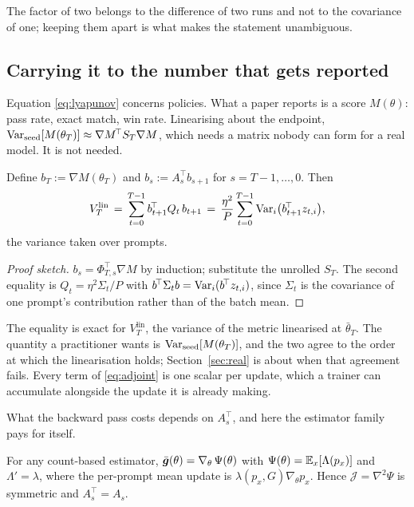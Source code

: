 The factor of two belongs to the difference of two runs and not to the covariance of one; keeping
them apart is what makes the statement unambiguous.

\subsection{Carrying it to the number that gets reported}

Equation \eqref{eq:lyapunov} concerns policies. What a paper reports is a score $M(\theta)$:
pass rate, exact match, win rate. Linearising about the endpoint,
$\operatorname{Var}_{\text{seed}}[M(\theta_T)] \approx \nabla M^{\!\top} S_T \nabla M$, which needs a matrix
nobody can form for a real model. It is not needed.

\begin{theorem}
  \label{thm:adjoint}
  Define $b_T := \nabla M(\theta_T)$ and $b_s := A_s^{\!\top} b_{s+1}$ for $s = T-1,\dots,0$. Then
  \begin{equation}
    \label{eq:adjoint}
      V^{\text{lin}}_T \,=\, \sum_{t=0}^{T-1} b_{t+1}^{\!\top} Q_t\, b_{t+1}
      \,=\, \frac{\eta^2}{P}\sum_{t=0}^{T-1} \operatorname{Var}_{i}\!\big(b_{t+1}^{\!\top} z_{t,i}\big),
  \end{equation}
  the variance taken over prompts.
\end{theorem}

\begin{proof}[Proof sketch]
  $b_s = \Phi_{T,s}^{\!\top}\nabla M$ by induction; substitute the unrolled $S_T$. The second
  equality is $Q_t = \eta^2\Sigma_t/P$ with
  $b^{\!\top}\Sigma_t b = \operatorname{Var}_i(b^{\!\top} z_{t,i})$, since $\Sigma_t$ is the covariance of one
  prompt's contribution rather than of the batch mean.
\end{proof}

The equality is exact for $V^{\text{lin}}_T$, the variance of the metric linearised at
$\bar\theta_T$. The quantity a practitioner wants is $\operatorname{Var}_{\text{seed}}[M(\theta_T)]$, and the two
agree to the order at which the linearisation holds; Section~\ref{sec:real} is about when that
agreement fails. Every term of \eqref{eq:adjoint} is one scalar per update, which a trainer can
accumulate alongside the update it is already making.

What the backward pass costs depends on $A_s^{\!\top}$, and here the estimator family pays for
itself.

\begin{proposition}
  \label{prop:potential}
  For any count-based estimator, $\bar{\bm{g}}(\theta) = \nabla_\theta\,\Psi(\theta)$ with
  $\Psi(\theta) = \mathbb{E}_x[\Lambda(p_x)]$ and $\Lambda' = \lambda$, where the per-prompt mean update is
  $\lambda(p_x, G)\nabla_\theta p_x$. Hence $\mathcal{J} = \nabla^2\Psi$ is symmetric and
  $A_s^{\!\top} = A_s$.
\end{proposition}

